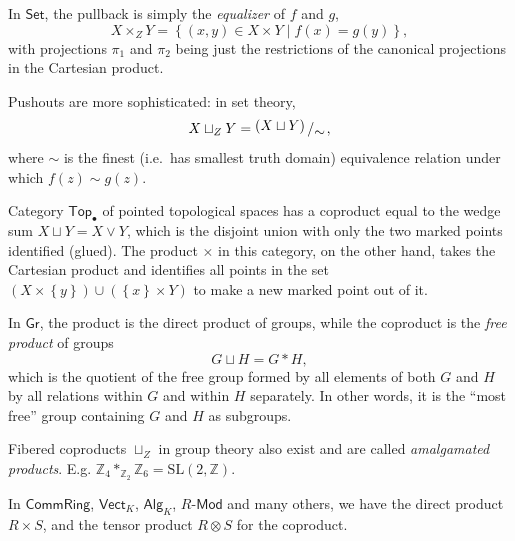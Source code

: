 \documentclass[english,letterpaper]{article}%
\numberwithin{equation}{section}
\numberwithin{figure}{section}
\numberwithin{table}{section}
\theoremstyle{definition}
\theoremstyle{definition}
\theoremstyle{definition}
\theoremstyle{plain}
\theoremstyle{plain}
\theoremstyle{plain}
\theoremstyle{plain}
\theoremstyle{remark}
\theoremstyle{remark}
\newcommand{\bigslant}[2]{{\raisebox{.2em}{$#1$}\left/\raisebox{-.2em}{$#2$}\right.}}
\begin{document}
%
\begin{example}\label{pullbacks in Set}
In $\mathsf{Set}$, the pullback is simply the \emph{equalizer}
of $f$ and $g$, 
\[
X\times_{Z}Y=\left\{ \left(x,y\right)\in X\times Y\mid f(x)=g(y)\right\} ,
\]
with projections $\pi_{1}$ and $\pi_{2}$ being just the restrictions
of the canonical projections in the Cartesian product.

Pushouts are more sophisticated: in set theory, 
\[
X\sqcup_{Z}Y=\bigslant{\left(X\sqcup Y\right)}{\sim},
\]
where $\sim$ is the finest (i.e.\ has smallest truth domain) equivalence
relation under which $f(z)\sim g(z)$.
\end{example}
%
\begin{example}
Category $\mathsf{Top}_{\bullet}$ of pointed topological spaces has
a coproduct equal to the wedge sum $X\sqcup Y=X\vee Y$, which is
the disjoint union with only the two marked points identified (glued).
The product $\times$ in this category, on the other hand, takes the
Cartesian product and identifies all points in the set $\left(X\times\left\{ y\right\} \right)\cup\left(\left\{ x\right\} \times Y\right)$
to make a new marked point out of it.
\end{example}
%
\begin{example}
In $\mathsf{Gr}$, the product is the direct product of groups, while
the coproduct is the \emph{free product} of groups 
\[
G\sqcup H=G\ast H,
\]
which is the quotient of the free group formed by all elements of
both $G$ and $H$ by all relations within $G$ and within $H$ separately.
In other words, it is the ``most free'' group containing $G$ and
$H$ as subgroups. 

Fibered coproducts $\sqcup_{Z}$ in group theory also exist and are
called \emph{amalgamated products}. E.g. $\mathbb{Z}_{4}\ast_{\mathbb{Z}_{2}}\mathbb{Z}_{6}=\mathrm{SL}\left(2,\mathbb{Z}\right)$.
\end{example}
%
\begin{example}
In $\mathsf{CommRing}$, $\mathsf{Vect}_{K}$, $\mathsf{Alg}_{K}$,
$R\text{-}\mathsf{Mod}$ and many others, we have the direct product
$R\times S$, and the tensor product $R\otimes S$ for the coproduct.
\end{example}
\end{document}
